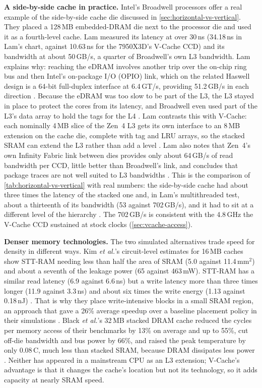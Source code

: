 \textbf{A side-by-side cache in practice.} Intel's Broadwell processors offer a real example of the side-by-side cache die discussed in \cref{sec:horizontal-vs-vertical}. They placed a 128\,MB embedded-DRAM die next to the processor die and used it as a fourth-level cache. Lam measured its latency at over 30\,ns (34.18\,ns in Lam's chart, against 10.63\,ns for the 7950X3D's V-Cache CCD) and its bandwidth at about 50\,GB/s, a quarter of Broadwell's own L3 bandwidth. Lam explains why: reaching the eDRAM involves another trip over the on-chip ring bus and then Intel's on-package I/O (OPIO) link, which on the related Haswell design is a 64-bit full-duplex interface at 6.4\,GT/s, providing 51.2\,GB/s in each direction \cite{lamAMDs7950X3DZen2023}. Because the eDRAM was too slow to be part of the L3, the L3 stayed in place to protect the cores from its latency, and Broadwell even used part of the L3's data array to hold the tags for the L4 \cite{lamAMDs7950X3DZen2023}. Lam contrasts this with V-Cache: each nominally 4\,MB slice of the Zen~4 L3 gets its own interface to an 8\,MB extension on the cache die, complete with tag and LRU arrays, so the stacked SRAM can extend the L3 rather than add a level \cite{lamAMDs7950X3DZen2023}. Lam also notes that Zen~4's own Infinity Fabric link between dies provides only about 64\,GB/s of read bandwidth per CCD, little better than Broadwell's link, and concludes that package traces are not well suited to L3 bandwidths \cite{lamAMDs7950X3DZen2023}. This is the comparison of \cref{tab:horizontal-vs-vertical} with real numbers: the side-by-side cache had about three times the latency of the stacked one and, in Lam's multithreaded test, about a thirteenth of its bandwidth (53 against 702\,GB/s), and it had to sit at a different level of the hierarchy \cite{lamAMDs7950X3DZen2023}. The 702\,GB/s is consistent with the 4.8\,GHz the V-Cache CCD sustained at stock clocks (\cref{sec:vcache-access}).

\textbf{Denser memory technologies.} The two simulated alternatives trade speed for density in different ways. Kim \emph{et al.}'s circuit-level estimates for 16\,MB caches show STT-RAM needing less than half the area of SRAM (5.0 against 11.4\,mm$^2$) and about a seventh of the leakage power (65 against 463\,mW). STT-RAM has a similar read latency (6.9 against 6.6\,ns) but a write latency more than three times longer (11.9 against 3.3\,ns) and about six times the write energy (1.13 against 0.18\,nJ) \cite[Table~1]{kimExploitingDataCompression2022}. That is why they place write-intensive blocks in a small SRAM region, an approach that gave a 26\% average speedup over a baseline placement policy in their simulations \cite{kimExploitingDataCompression2022}. Black \emph{et al.}'s 32\,MB stacked DRAM cache reduced the cycles per memory access of their benchmarks by 13\% on average and up to 55\%, cut off-die bandwidth and bus power by 66\%, and raised the peak temperature by only 0.08\,\textdegree C, much less than stacked SRAM, because DRAM dissipates less power \cite{blackStacking3DMicroarchitecture2006}. Neither has appeared in a mainstream CPU as an L3 extension; V-Cache's advantage is that it changes the cache's location but not its technology, so it adds capacity at nearly SRAM speed.

